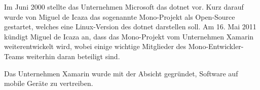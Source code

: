 Im Juni 2000 stellte das Unternehmen Microsoft das \ac{dotnet} vor.
Kurz darauf wurde von Miguel de Icaza das sogenannte Mono-Projekt als Open-Source gestartet, welches eine Linux-Version des \ac{dotnet} darstellen soll.
Am 16. Mai 2011 kündigt Miguel de Icaza an, dass das Mono-Projekt vom Unternehmen Xamarin weiterentwickelt wird, wobei einige wichtige Mitglieder des Mono-Entwickler-Teams weiterhin daran beteiligt sind.

Das Unternehmen Xamarin wurde mit der Absicht gegründet, Software auf mobile Geräte zu vertreiben.